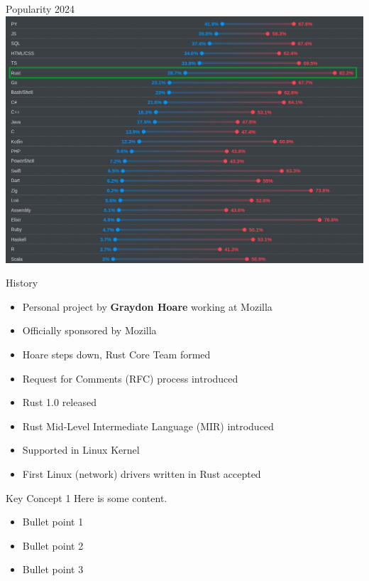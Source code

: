 \documentclass{beamer}
\begin{document}
\begin{frame}{Popularity 2024} 
\includegraphics[scale=0.35]{desired-admired-2024}
\end{frame} 

\begin{frame}{History}
    \begin{itemize}
        \item[2006] Personal project by \textbf{Graydon Hoare} working at Mozilla
        \item[2009] Officially sponsored by Mozilla
        \item[2013] Hoare steps down, Rust Core Team formed
        \item[2014] Request for Comments (RFC) process introduced
        \item[2015] Rust 1.0 released
        \item[2016] Rust Mid-Level Intermediate Language (MIR) introduced
        \item[2022] Supported in Linux Kernel
        \item[2024] First Linux (network) drivers written in Rust accepted
    \end{itemize}
\end{frame}



\begin{frame}{Key Concept 1}
    Here is some content.
    \begin{itemize}
        \item Bullet point 1
        \item Bullet point 2
        \item Bullet point 3
    \end{itemize}
\end{frame}
\end{document}
